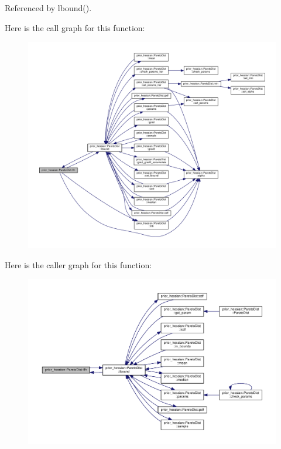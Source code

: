 Referenced by lbound().



Here is the call graph for this function\+:\nopagebreak
\begin{figure}[H]
\begin{center}
\leavevmode
\includegraphics[width=350pt]{classprior__hessian_1_1ParetoDist_a0f7ee813a098cd3fc9c7669cda6a340c_cgraph}
\end{center}
\end{figure}




Here is the caller graph for this function\+:\nopagebreak
\begin{figure}[H]
\begin{center}
\leavevmode
\includegraphics[width=350pt]{classprior__hessian_1_1ParetoDist_a0f7ee813a098cd3fc9c7669cda6a340c_icgraph}
\end{center}
\end{figure}


